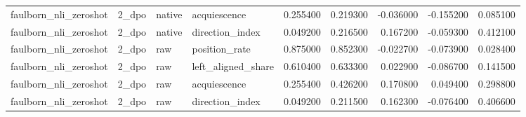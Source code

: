 \begin{tabular}{llllrrrrr}
faulborn_nli_zeroshot & 2_dpo & native & acquiescence & 0.255400 & 0.219300 & -0.036000 & -0.155200 & 0.085100 \\
faulborn_nli_zeroshot & 2_dpo & native & direction_index & 0.049200 & 0.216500 & 0.167200 & -0.059300 & 0.412100 \\
faulborn_nli_zeroshot & 2_dpo & raw & position_rate & 0.875000 & 0.852300 & -0.022700 & -0.073900 & 0.028400 \\
faulborn_nli_zeroshot & 2_dpo & raw & left_aligned_share & 0.610400 & 0.633300 & 0.022900 & -0.086700 & 0.141500 \\
faulborn_nli_zeroshot & 2_dpo & raw & acquiescence & 0.255400 & 0.426200 & 0.170800 & 0.049400 & 0.298800 \\
faulborn_nli_zeroshot & 2_dpo & raw & direction_index & 0.049200 & 0.211500 & 0.162300 & -0.076400 & 0.406600 \\
\bottomrule
\end{tabular}
